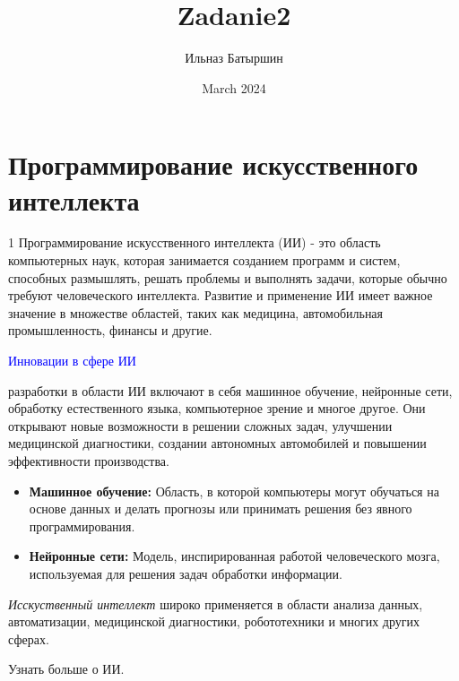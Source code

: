 \documentclass{article}
\title{Zadanie2}
\author{Ильназ Батыршин}
\date{March 2024}
\begin{document}
\section*{Программирование искусственного интеллекта}
\begin{spacing} {1}
Программирование искусственного интеллекта (ИИ) - это область компьютерных наук, которая занимается созданием программ и систем, способных размышлять, решать проблемы и выполнять задачи, которые обычно требуют человеческого интеллекта. Развитие и применение ИИ имеет важное значение в множестве областей, таких как медицина, автомобильная промышленность, финансы и другие.
\end{spacing}
\par\bigskip\noindent\textcolor{blue} {Инновации в сфере ИИ}
\par{} разработки в области ИИ включают в себя машинное обучение, нейронные сети, обработку естественного языка, компьютерное зрение и многое другое. Они открывают новые возможности в решении сложных задач, улучшении медицинской диагностики, создании автономных автомобилей и повышении эффективности производства.

\begin{itemize} %
    \item\textbf{Машинное обучение:} Область, в которой компьютеры могут обучаться на основе данных и делать прогнозы или принимать решения без явного программирования.

    \item\textbf{Нейронные сети:} Модель, инспирированная работой человеческого мозга, используемая для решения задач обработки информации.
\end{itemize}

\textit{Исскуственный интеллект} широко применяется в области анализа данных, автоматизации, медицинской диагностики, робототехники и многих других сферах.
\par{} {Узнать больше о ИИ}.
\end{document}
